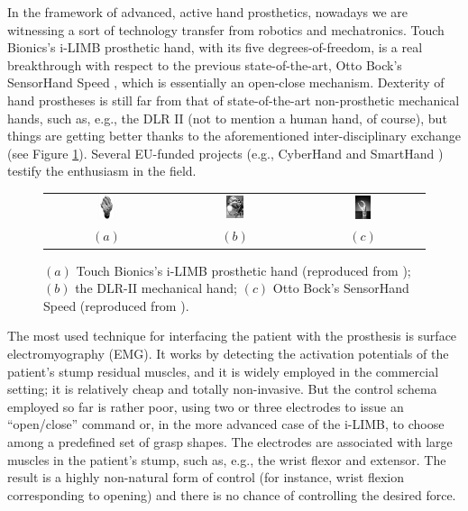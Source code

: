 In the framework of advanced, active hand prosthetics, nowadays we are
witnessing a sort of technology transfer from robotics and
mechatronics. Touch Bionics's i-LIMB \cite{ilimb} prosthetic hand,
with its five degrees-of-freedom, is a real breakthrough with respect
to the previous state-of-the-art, Otto Bock's SensorHand Speed
\cite{sensorhand}, which is essentially an open-close
mechanism. Dexterity of hand prostheses is still far from that of
state-of-the-art non-prosthetic mechanical hands, such as, e.g., the
DLR II \cite{Hua2006} (not to mention a human hand, of course), but
things are getting better thanks to the aforementioned
inter-disciplinary exchange (see Figure \ref{fig:hands}). Several
EU-funded projects (e.g., CyberHand \cite{CyberHand} and SmartHand
\cite{smarthand}) testify the enthusiasm in the field.

\begin{figure}
  \begin{tabular}{ccc}
    \includegraphics[width=0.14\textwidth]{figs/hands_TB.jpg} &
    \includegraphics[width=0.14\textwidth]{figs/hands_DLRII.jpg} &
    \includegraphics[width=0.14\textwidth]{figs/hands_OB.jpg} \\
    $(a)$ & $(b)$ & $(c)$
  \end{tabular}
  \caption{$(a)$ Touch Bionics's i-LIMB prosthetic hand (reproduced
    from \cite{ilimb}); $(b)$ the DLR-II mechanical hand; $(c)$ Otto
    Bock's SensorHand Speed (reproduced from \cite{sensorhand}).}
  \label{fig:hands}
\end{figure}

The most used technique for interfacing the patient with the
prosthesis is surface electromyography (EMG). It works by detecting
the activation potentials of the patient's stump residual muscles, and
it is widely employed in the commercial setting; it is relatively
cheap and totally non-invasive. But the control schema employed so far
is rather poor, using two or three electrodes to issue an
``open/close'' command or, in the more advanced case of the i-LIMB, to
choose among a predefined set of grasp shapes. The electrodes are
associated with large muscles in the patient's stump, such as, e.g.,
the wrist flexor and extensor. The result is a highly non-natural form
of control (for instance, wrist flexion corresponding to opening) and
there is no chance of controlling the desired force.

